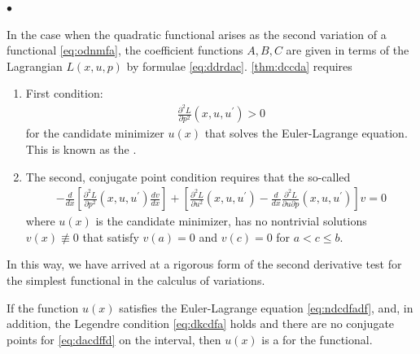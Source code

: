 \documentclass{article}
\begin{document}
$\bullet$ 

In the case when the quadratic functional arises as the second variation of a functional \cref{eq:odnmfa}, the coefficient functions $A, B, C$ are given in terms of the Lagrangian $L(x, u, p)$ by formulae \cref{eq:ddrdac}.  \cref{thm:dccda} requires
\begin{enumerate}
    \item First condition:\begin{align}
\frac{\partial^{2} L}{\partial p^{2}}\left(x, u, u^{\prime}\right)>0 \label{eq:dkcdfa}
\end{align}
for the candidate minimizer $u(x)$ that solves the Euler-Lagrange equation. This is known as the .
\item  The second, conjugate point condition requires that the so-called 
\begin{align}
-\frac{d}{d x}\left[\frac{\partial^{2} L}{\partial p^{2}}\left(x, u, u^{\prime}\right) \frac{d v}{d x}\right]+\left[\frac{\partial^{2} L}{\partial u^{2}}\left(x, u, u^{\prime}\right)-\frac{d}{d x} \frac{\partial^{2} L}{\partial u \partial p}\left(x, u, u^{\prime}\right)\right] v=0 \label{eq:dacdffd}
\end{align}
where $u(x)$ is the candidate minimizer, has no nontrivial solutions $v(x) \not \equiv 0$ that satisfy $v(a)=0$ and $v(c)=0$ for $a<c \leq b$. 
\end{enumerate}
In this way, we have arrived at a rigorous form of the second derivative test for the simplest functional in the calculus of variations.

\begin{thma}
If the function $u(x)$ satisfies the Euler-Lagrange equation \cref{eq:ndcdfadf}, and, in addition, the Legendre condition \cref{eq:dkcdfa} holds and there are no conjugate points for \cref{eq:dacdffd} on the interval, then $u(x)$ is a  for the functional.
\end{thma} 
\end{document}
